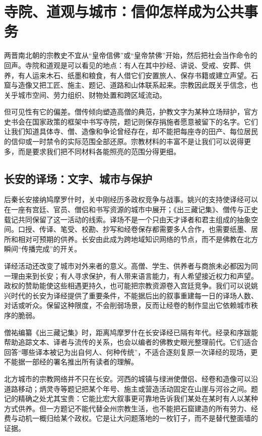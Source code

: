 \section{寺院、道观与城市：信仰怎样成为公共事务}
\label{sec:synthesis-religion-cities}

两晋南北朝的宗教史不宜从“皇帝信佛”或“皇帝禁佛”开始，然后把社会当作命令的回声。寺院和道观是可以看见的地点：有人在其中抄经、讲说、受戒、安葬、供养，有人运来木石、纸墨和粮食，有人借它们安置旅人、保存书籍或建立声望。石窟与造像又把工匠、施主、题记、道路和山体联系起来。宗教因此既关乎信念，也关乎城市空间、劳力组织、财物处置和跨区域流动。

但可见性有它的偏差。僧传倾向塑造高僧的典范，护教文字为某种立场辩护，官方史书会在国家政策的框架中书写寺院，题记则保存捐施者愿意被留下的名字。它们让我们知道具体寺、僧、造像和争论曾经存在，却不能把每座寺的田产、每位居民的信仰或一时禁令的实际范围全部还原。宗教材料的丰富不是让我们可以说得更多，而是要求我们把不同材料各能照亮的范围分得更细。

\subsection{长安的译场：文字、城市与保护}

后秦长安接纳鸠摩罗什时，关中刚经历多政权竞争与战事。姚兴的支持使译经可以在一座有宫廷、官员、僧侣和书写资源的城市中展开；《出三藏记集》、僧传与正史载记共同保留了这一活动的线索。译场不是一个只由天才译者和君主组成的抽象空间。口授、传译、笔受、校勘、抄写和经卷保存都需要多人合作，也需要纸墨、居所和相对可预期的供养。长安由此成为跨地域知识网络的节点，而不是佛教在北方瞬间“传播完成”的开关。

译经活动还改变了城市对外来者的意义。高僧、学生、供养者与商旅未必都因为同一理由来到长安；有人寻求保护，有人带来语言能力，有人希望接近权力和声望。政权的赞助能使这些相遇更持久，也可能把宗教资源卷入宫廷竞争。我们可以说姚兴时代的长安为译经提供了重要条件，不能据后出的叙事重建每一日的译场人数、对话或听众。保留这种限度，不会削弱场景，反而让经卷的制作显出它依赖城市秩序的脆弱。

\begin{textwindow}
僧祐编纂《出三藏记集》时，距离鸠摩罗什在长安译经已隔有年代。经录和序跋能帮助追踪文本、译者与流传的关系，也会以编者的佛教史眼光整理前代。它们适合回答“哪些译本被记为出自何人、何种传统”，不适合逐刻复原一次译经的现场，更不能据一部经的署名推出所有读者的理解。
\end{textwindow}

北方城市的宗教网络并不只在长安。河西的城镇与绿洲使僧侣、经卷和造像可以沿道路移动；炳灵寺等题记把某个年号、施主或营造活动固定在山崖与河谷之间。题记的精确之处尤其宝贵：它能比宏大叙事更可靠地告诉我们某处在某时有人以某种方式供养。但一方题记不能代替全州宗教生活，也不能把石窟建造的所有劳力、经费与动机一概归给某个政权。它是让大问题落地的一枚钉子，而不是替代整面墙的证据。

